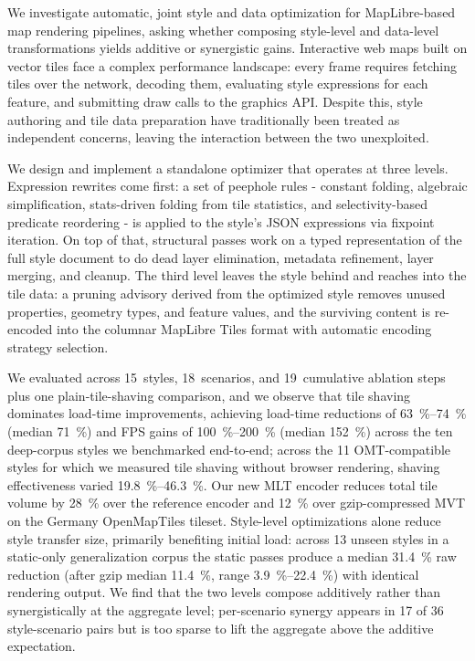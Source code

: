 We investigate automatic, joint style and data optimization for MapLibre-based map rendering pipelines, asking whether composing style-level and data-level transformations yields additive or synergistic gains.
Interactive web maps built on vector tiles face a complex performance landscape: every frame requires fetching tiles over the network, decoding them, evaluating style expressions for each feature, and submitting draw calls to the graphics \ac{API}.
Despite this, style authoring and tile data preparation have traditionally been treated as independent concerns, leaving the interaction between the two unexploited.

We design and implement a standalone optimizer that operates at three levels.
Expression rewrites come first: a set of peephole rules - constant folding, algebraic simplification, stats-driven folding from tile statistics, and selectivity-based predicate reordering - is applied to the style's \ac{JSON} expressions via fixpoint iteration.
On top of that, structural passes work on a typed representation of the full style document to do dead layer elimination, metadata refinement, layer merging, and cleanup.
The third level leaves the style behind and reaches into the tile data: a pruning advisory derived from the optimized style removes unused properties, geometry types, and feature values, and the surviving content is re-encoded into the columnar MapLibre Tiles format with automatic encoding strategy selection.

We evaluated across 15~styles, 18~scenarios, and 19~cumulative ablation steps plus one plain-tile-shaving comparison, and we observe that tile shaving dominates load-time improvements, achieving load-time reductions of \qtyrange{63}{74}{\percent} (median \qty{71}{\percent}) and \ac{FPS} gains of \qtyrange{100}{200}{\percent} (median \qty{152}{\percent}) across the ten deep-corpus styles we benchmarked end-to-end; across the 11 \ac{OMT}-compatible styles for which we measured tile shaving without browser rendering, shaving effectiveness varied \qtyrange{19.8}{46.3}{\percent}.
Our new \ac{MLT} encoder reduces total tile volume by \qty{28}{\percent} over the reference encoder and \qty{12}{\percent} over gzip-compressed \ac{MVT} on the Germany OpenMapTiles tileset.
Style-level optimizations alone reduce style transfer size, primarily benefiting initial load: across 13 unseen styles in a static-only generalization corpus the static passes produce a median \qty{31.4}{\percent} raw reduction (after gzip median \qty{11.4}{\percent}, range \qtyrange{3.9}{22.4}{\percent}) with identical rendering output.
We find that the two levels compose additively rather than synergistically at the aggregate level; per-scenario synergy appears in 17 of 36 style-scenario pairs but is too sparse to lift the aggregate above the additive expectation.
